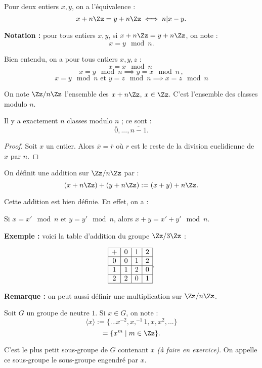 \documentclass[class=report,crop=false]{standalone}
\newcommand{\exoo}{\emph{(à faire en exercice)}}
\begin{document}
\begin{proposition}
Pour deux entiers $x,y$, on a l'équivalence :
\[x+n\Zz = y + n\Zz \iff n | x-y .\]
\end{proposition}

{\bf Notation :} pour tous entiers $x,y$, si $x+n\Zz = y +n\Zz$, on note :
\[x=y \mod n .\]

Bien entendu, on a pour tous entiers $x,y,z$ :
\[x =x \mod n\,\,\]
\[ x=y \mod n\implies y=x \mod n\,,\]
\[ x=y \mod n \text{ et } y = z \mod n \implies x=z \mod n\] 

On note $\Zz/n\Zz$ l'ensemble des $x+n\Zz$, $x \in \Zz$. C'est l'ensemble des classes modulo $n$. 

\begin{proposition}
Il y a exactement $n$ classes modulo $n$ ; ce sont :
\[\overline{0},...,\overline{n-1}.\]
\end{proposition}

\begin{proof}
Soit $x$ un entier. Alors $\overline{x} = \overline{r}$ où $r$ est le reste de la division euclidienne de $x$ par $n$.
\end{proof}

On définit une addition sur $\Zz/n\Zz$ par :
\[(x+n\Zz) + (y +n\Zz) := (x+y) +n\Zz .\]

Cette addition est bien définie. En effet, on a :
\begin{proposition}
Si $x=x' \mod n$ et $y=y'\mod n$, alors $x+y = x'+y' \mod n$.
\end{proposition}


{\bf Exemple :} voici la table d'addition du groupe $\Zz/3\Zz$ :

\[\begin{array}{|c|c|c|c|}
\hline
+&0&1&2\\
\hline
0&0&1&2\\
\hline
1&1&2&0\\
\hline
2&2&0&1\\
\hline
\end{array}.\]


{\bf Remarque :} on peut aussi définir une multiplication sur $\Zz/n\Zz$.


Soit $G$ un groupe de neutre $1$. Si $x \in G$, on note :
\[\langle x \rangle := \{...x^{-2},x,^{-1} 1,x,x^2,...\}\]
\[= \{x^m\mid m \in \Zz\} .\]

C'est le plus petit sous-groupe de $G$ contenant $x$ \exoo. 
On appelle ce sous-groupe le sous-groupe engendré par $x$.
\end{document}
